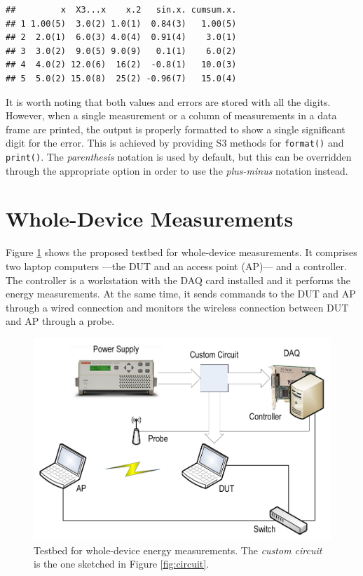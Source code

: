 \documentclass[twoside,nohyper]{tufte-book}
\theoremstyle{definition}
\theoremstyle{definition}
\theoremstyle{definition}
\theoremstyle{remark}
\begin{document}
\begin{verbatim}
##         x  X3...x    x.2   sin.x. cumsum.x.
## 1 1.00(5)  3.0(2) 1.0(1)  0.84(3)   1.00(5)
## 2  2.0(1)  6.0(3) 4.0(4)  0.91(4)    3.0(1)
## 3  3.0(2)  9.0(5) 9.0(9)   0.1(1)    6.0(2)
## 4  4.0(2) 12.0(6)  16(2)  -0.8(1)   10.0(3)
## 5  5.0(2) 15.0(8)  25(2) -0.96(7)   15.0(4)
\end{verbatim}

It is worth noting that both values and errors are stored with all the
digits. However, when a single measurement or a column of measurements
in a data frame are printed, the output is properly formatted to show a
single significant digit for the error. This is achieved by providing S3
methods for \texttt{format()} and \texttt{print()}. The
\emph{parenthesis} notation is used by default, but this can be
overridden through the appropriate option in order to use the
\emph{plus-minus} notation instead.

\section{Whole-Device Measurements}\label{whole-device-measurements}

Figure \ref{fig:testbed} shows the proposed testbed for whole-device
measurements. It comprises two laptop computers ---the DUT and an access
point (AP)--- and a controller. The controller is a workstation with the
DAQ card installed and it performs the energy measurements. At the same
time, it sends commands to the DUT and AP through a wired connection and
monitors the wireless connection between DUT and AP through a probe.




\begin{figure}

{\centering \includegraphics{img/03/testbed} 

}

\caption[Testbed for whole-device energy measurements. The
\emph{custom circuit} is the one sketched in Figure \ref{fig:circuit}.]{Testbed for whole-device energy measurements. The
\emph{custom circuit} is the one sketched in Figure \ref{fig:circuit}.}\label{fig:testbed}
\end{figure}
\end{document}

